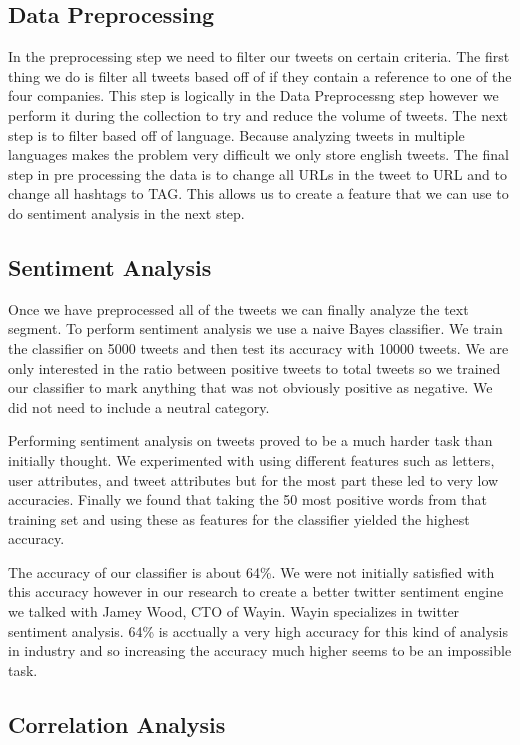 \documentclass{acm_proc_article-sp}
\begin{document}
\subsection{Data Preprocessing}

In the preprocessing step we need to filter our tweets on certain criteria. The
first thing we do is filter all tweets based off of if they contain a reference
to one of the four companies. This step is logically in the Data Preprocessng
step however we perform it during the collection to try and reduce the volume
of tweets.  The next step is to filter based off of language. Because analyzing
tweets in multiple languages makes the problem very difficult we only store
english tweets. The final step in pre processing the data is to change all URLs
in the tweet to URL and to change all hashtags to TAG. This allows us to create
a feature that we can use to do sentiment analysis in the next step.

\subsection{Sentiment Analysis}

Once we have preprocessed all of the tweets we can finally analyze the text
segment. To perform sentiment analysis we use a naive Bayes classifier. We
train the classifier on 5000 tweets and then test its accuracy with 10000
tweets.  We are only interested in the ratio between positive tweets to total
tweets so we trained our classifier to mark anything that was not obviously
positive as negative. We did not need to include a neutral category. 

Performing sentiment analysis on tweets proved to be a much harder task than
initially thought. We experimented with using different features such as
letters, user attributes, and tweet attributes but for the most part these led
to very low accuracies. Finally we found that taking the 50 most positive words
from that training set and using these as features for the classifier yielded
the highest accuracy. 

The accuracy of our classifier is about 64\%. We were
not initially satisfied with this accuracy however in our research to create a
better twitter sentiment engine we talked with Jamey Wood, CTO of Wayin. Wayin
specializes in twitter sentiment analysis. 64\% is acctually a very high
accuracy for this kind of analysis in industry and so increasing the accuracy
much higher seems to be an impossible task.
 
\subsection{Correlation Analysis}
\end{document}
